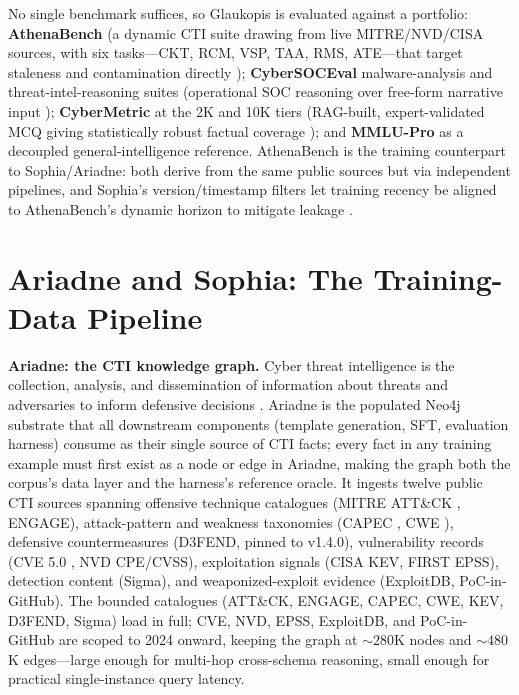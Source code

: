 \documentclass[conference]{IEEEtran}
\begin{document}
No single benchmark suffices, so Glaukopis is evaluated against a portfolio: \textbf{AthenaBench} (a dynamic CTI suite drawing from live MITRE/NVD/CISA sources, with six tasks---CKT, RCM, VSP, TAA, RMS, ATE---that target staleness and contamination directly \cite{alam2025athenabench}); \textbf{CyberSOCEval} malware-analysis and threat-intel-reasoning suites (operational SOC reasoning over free-form narrative input \cite{cybersoceval2025}); \textbf{CyberMetric} at the 2K and 10K tiers (RAG-built, expert-validated MCQ giving statistically robust factual coverage \cite{tihanyi2024cybermetric}); and \textbf{MMLU-Pro} as a decoupled general-intelligence reference. AthenaBench is the training counterpart to Sophia/Ariadne: both derive from the same public sources but via independent pipelines, and Sophia's version/timestamp filters let training recency be aligned to AthenaBench's dynamic horizon to mitigate leakage \cite{cardei2025ift,alam2025athenabench}.

\section{Ariadne and Sophia: The Training-Data Pipeline}
\label{sec:cti-kg}

\textbf{Ariadne: the CTI knowledge graph.} Cyber threat intelligence is the collection, analysis, and dissemination of information about threats and adversaries to inform defensive decisions \cite{mcmillan2013gartner}. Ariadne is the populated Neo4j substrate that all downstream components (template generation, SFT, evaluation harness) consume as their single source of CTI facts; every fact in any training example must first exist as a node or edge in Ariadne, making the graph both the corpus's data layer and the harness's reference oracle. It ingests twelve public CTI sources spanning offensive technique catalogues (MITRE ATT\&CK \cite{strom2018mitreattck}, ENGAGE), attack-pattern and weakness taxonomies (CAPEC \cite{mitreCAPEC}, CWE \cite{mitreCWE}), defensive countermeasures (D3FEND, pinned to v1.4.0), vulnerability records (CVE 5.0 \cite{mitreCVE}, NVD CPE/CVSS), exploitation signals (CISA KEV, FIRST EPSS), detection content (Sigma), and weaponized-exploit evidence (ExploitDB, PoC-in-GitHub). The bounded catalogues (ATT\&CK, ENGAGE, CAPEC, CWE, KEV, D3FEND, Sigma) load in full; CVE, NVD, EPSS, ExploitDB, and PoC-in-GitHub are scoped to 2024 onward, keeping the graph at ${\sim}280$K nodes and ${\sim}480$K edges---large enough for multi-hop cross-schema reasoning, small enough for practical single-instance query latency.
\end{document}
